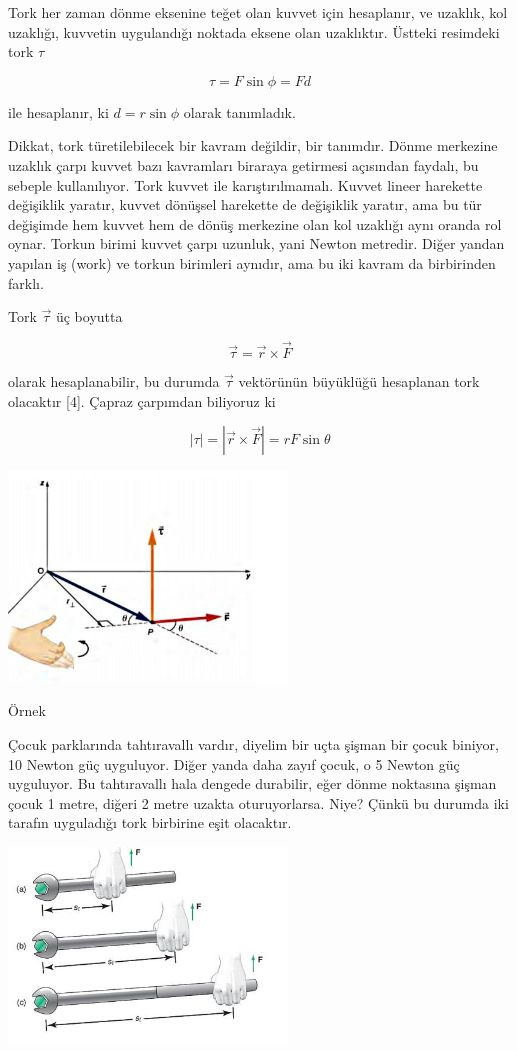 \documentclass[12pt,fleqn]{article}\usepackage{../../common}
\begin{document}
Tork her zaman dönme eksenine teğet olan kuvvet için hesaplanır, ve
uzaklık, kol uzaklığı, kuvvetin uygulandığı noktada eksene olan
uzaklıktır. Üstteki resimdeki tork $\tau$

$$
\tau = F \sin \phi = F d
$$

ile hesaplanır, ki $d = r \sin\phi$ olarak tanımladık.

Dikkat, tork türetilebilecek bir kavram değildir, bir tanımdır. Dönme merkezine
uzaklık çarpı kuvvet bazı kavramları biraraya getirmesi açısından faydalı, bu
sebeple kullanılıyor. Tork kuvvet ile karıştırılmamalı. Kuvvet lineer harekette
değişiklik yaratır, kuvvet dönüşsel harekette de değişiklik yaratır, ama bu tür
değişimde hem kuvvet hem de dönüş merkezine olan kol uzaklığı aynı oranda rol
oynar. Torkun birimi kuvvet çarpı uzunluk, yani Newton metredir. Diğer yandan
yapılan iş (work) ve torkun birimleri aynıdır, ama bu iki kavram da birbirinden
farklı.

Tork $\vec{\tau}$ üç boyutta

$$
\vec{\tau} = \vec{r} \times \vec{F}
$$

olarak hesaplanabilir, bu durumda $\vec{\tau}$ vektörünün büyüklüğü hesaplanan
tork olacaktır [4]. Çapraz çarpımdan biliyoruz ki

$$
|\tau| = | \vec{r} \times \vec{F} | = r F \sin\theta
$$

\includegraphics[width=20em]{phy_005_basics_02_04.jpg}

Örnek

Çocuk parklarında tahtıravallı vardır, diyelim bir uçta şişman bir çocuk
biniyor, 10 Newton güç uyguluyor. Diğer yanda daha zayıf çocuk, o 5 Newton
güç uyguluyor. Bu tahtıravallı hala dengede durabilir, eğer dönme noktasına
şişman çocuk 1 metre, diğeri 2 metre uzakta oturuyorlarsa. Niye? Çünkü bu
durumda iki tarafın uyguladığı tork birbirine eşit olacaktır.

\includegraphics[width=20em]{phy_005_basics_02_07.jpg}
\end{document}

